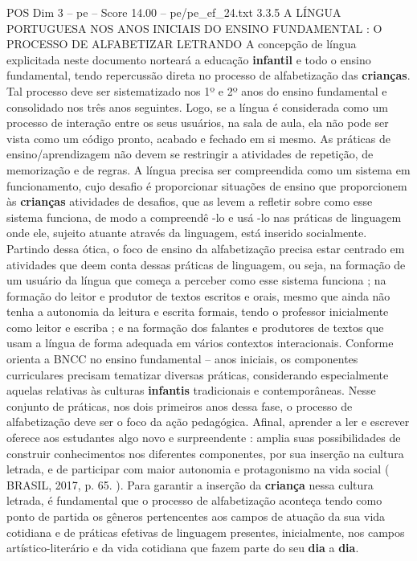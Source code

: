 \begin{textsample}{POS Dim 3 – pe – Score 14.00 – pe/pe\_ef\_24.txt}  \label{ex:f3_pos_280}
3.3.5 A LÍNGUA PORTUGUESA NOS ANOS INICIAIS DO ENSINO FUNDAMENTAL : O PROCESSO DE ALFABETIZAR LETRANDO A concepção de língua explicitada neste documento norteará a educação \textbf{infantil} e todo o ensino fundamental, tendo repercussão direta no processo de alfabetização das \textbf{crianças}.
Tal processo deve ser sistematizado nos 1º e 2º anos do ensino fundamental e consolidado nos três anos seguintes.
Logo, se a língua é considerada como um processo de interação entre os seus usuários, na sala de aula, ela não pode ser vista como um código pronto, acabado e fechado em si mesmo.
As práticas de ensino/aprendizagem não devem se restringir a atividades de repetição, de memorização e de regras.
A língua precisa ser compreendida como um sistema em funcionamento, cujo desafio é proporcionar situações de ensino que proporcionem às \textbf{crianças} atividades de desafios, que as levem a refletir sobre como esse sistema funciona, de modo a compreendê -lo e usá -lo nas práticas de linguagem onde ele, sujeito atuante através da linguagem, está inserido socialmente.
Partindo dessa ótica, o foco de ensino da alfabetização precisa estar centrado em atividades que deem conta dessas práticas de linguagem, ou seja, na formação de um usuário da língua que começa a perceber como esse sistema funciona ; na formação do leitor e produtor de textos escritos e orais, mesmo que ainda não tenha a autonomia da leitura e escrita formais, tendo o professor inicialmente como leitor e escriba ; e na formação dos falantes e produtores de textos que usam a língua de forma adequada em vários contextos interacionais.
Conforme orienta a BNCC no ensino fundamental – anos iniciais, os componentes curriculares precisam tematizar diversas práticas, considerando especialmente aquelas relativas às culturas \textbf{infantis} tradicionais e contemporâneas.
Nesse conjunto de práticas, nos dois primeiros anos dessa fase, o processo de alfabetização deve ser o foco da ação pedagógica.
Afinal, aprender a ler e escrever oferece aos estudantes algo novo e surpreendente : amplia suas possibilidades de construir conhecimentos nos diferentes componentes, por sua inserção na cultura letrada, e de participar com maior autonomia e protagonismo na vida social ( BRASIL, 2017, p. 65. ).
Para garantir a inserção da \textbf{criança} nessa cultura letrada, é fundamental que o processo de alfabetização aconteça tendo como ponto de partida os gêneros pertencentes aos campos de atuação da sua vida cotidiana e de práticas efetivas de linguagem presentes, inicialmente, nos campos artístico-literário e da vida cotidiana que fazem parte do seu \textbf{dia} a \textbf{dia}.

\end{textsample}
